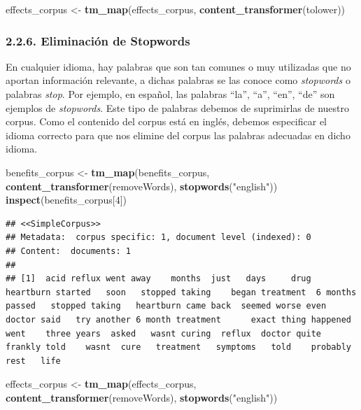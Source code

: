 \documentclass[spanish,]{article}
\newenvironment{Shaded}{\begin{snugshade}}{\end{snugshade}}
\newcommand{\KeywordTok}[1]{\textcolor[rgb]{0.13,0.29,0.53}{\textbf{#1}}}
\newcommand{\DecValTok}[1]{\textcolor[rgb]{0.00,0.00,0.81}{#1}}
\newcommand{\StringTok}[1]{\textcolor[rgb]{0.31,0.60,0.02}{#1}}
\newcommand{\NormalTok}[1]{#1}
\begin{document}
\begin{Shaded}
\begin{Highlighting}[]
\NormalTok{effects_corpus <-}\StringTok{ }\KeywordTok{tm_map}\NormalTok{(effects_corpus, }\KeywordTok{content_transformer}\NormalTok{(tolower))}
\end{Highlighting}
\end{Shaded}

\subsubsection{2.2.6. Eliminación de
Stopwords}\label{eliminacion-de-stopwords}

En cualquier idioma, hay palabras que son tan comunes o muy utilizadas
que no aportan información relevante, a dichas palabras se las conoce
como \emph{stopwords} o palabras \emph{stop}. Por ejemplo, en español,
las palabras ``la'', ``a'', ``en'', ``de'' son ejemplos de
\emph{stopwords}. Este tipo de palabras debemos de suprimirlas de
nuestro corpus. Como el contenido del corpus está en inglés, debemos
especificar el idioma correcto para que nos elimine del corpus las
palabras adecuadas en dicho idioma.

\begin{Shaded}
\begin{Highlighting}[]
\NormalTok{benefits_corpus <-}\StringTok{ }\KeywordTok{tm_map}\NormalTok{(benefits_corpus, }\KeywordTok{content_transformer}\NormalTok{(removeWords), }\KeywordTok{stopwords}\NormalTok{(}\StringTok{"english"}\NormalTok{))}
\KeywordTok{inspect}\NormalTok{(benefits_corpus[}\DecValTok{4}\NormalTok{])}
\end{Highlighting}
\end{Shaded}

\begin{verbatim}
## <<SimpleCorpus>>
## Metadata:  corpus specific: 1, document level (indexed): 0
## Content:  documents: 1
## 
## [1]  acid reflux went away    months  just   days     drug  heartburn started   soon   stopped taking    began treatment  6 months passed   stopped taking   heartburn came back  seemed worse even  doctor said   try another 6 month treatment      exact thing happened  went    three years  asked   wasnt curing  reflux  doctor quite frankly told    wasnt  cure   treatment   symptoms   told    probably      rest   life
\end{verbatim}

\begin{Shaded}
\begin{Highlighting}[]
\NormalTok{effects_corpus <-}\StringTok{ }\KeywordTok{tm_map}\NormalTok{(effects_corpus, }\KeywordTok{content_transformer}\NormalTok{(removeWords), }\KeywordTok{stopwords}\NormalTok{(}\StringTok{"english"}\NormalTok{))}
\end{Highlighting}
\end{Shaded}
\end{document}
